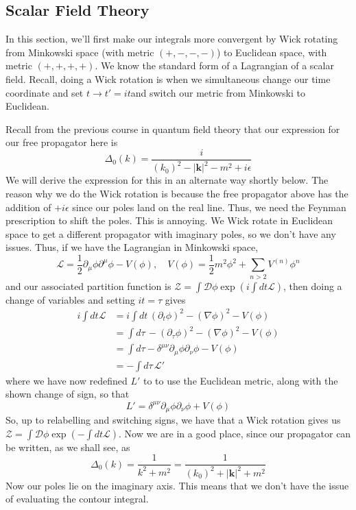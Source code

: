 \documentclass[11pt, oneside]{article}   	%
\theoremstyle{slanted}
\let\vec\mathbf
\begin{document}
\subsection{Scalar Field Theory}
In this section, 
we'll first make our integrals more convergent 
by Wick rotating from Minkowski space (with metric $\left( +, - , -, - \right) $) to Euclidean space, 
with metric $ \left( +, +, + , +  \right) $.
We know the standard form of a Lagrangian 
of a scalar field.
Recall, doing a Wick rotation 
is when we simultaneous change our time coordinate 
and set $ t \to t ' = i t $and switch our metric from Minkowski 
to Euclidean.

Recall from 
the previous course in quantum field theory that our expression for our 
free propagator here 
is
\[
\Delta _ 0 \left( k  \right)   = \frac{i}{\left( k_0  \right)^ 2  - | \vec{k} | ^2  - 	 m ^ 2 + i \epsilon }
\] We will derive 
the expression for this in an alternate way shortly below. 
The reason why we do the Wick rotation is because the 
free propagator above has the addition of $ + i\epsilon $ 
since our poles land on the real line. Thus, 
we need the Feynman prescription to shift the poles. 
This is annoying. We Wick rotate in Euclidean 
space to get a different propagator with imaginary poles, 
so we don't have any issues. 
Thus, if we have the Lagrangian in Minkowski space, 
\[
\mathcal{ L }  = \frac{1}{2 } \partial _ \mu \phi \partial  ^ \mu \phi   - V \left( \phi  \right), 
\quad V \left(\phi  \right)  = \frac{1}{2 } m ^ 2 \phi ^ 2 + 
\sum _{ n > 2} V ^{ \left( n  \right)  } \phi ^ n 
\] and our associated partition function is 
$ \mathcal{ Z }  = \int \mathcal{ D } \phi \exp\left( i \int dt  \mathcal{ L }  \right)    $, 
then doing a change of variables and setting 
$ i t  =  \tau $ gives 
\begin{align*}
i \int dt \mathcal{ L } &=  i \int dt \, 
\left( \partial  _ t \phi  \right)  ^ 2  - \left( \nabla \phi  \right)^ 2 
- V \left( \phi  \right)  	 \\
&=  \int d \tau \,  - \left( 
\partial  _ \tau \phi \right)  ^ 2 
- \left( \nabla \phi  \right)  ^ 2 
- V \left( \phi  \right)  \\ 
&=  \int d \tau 
- \delta ^{ \mu \nu } \partial  _ \mu \phi \partial  _ \nu \phi 
- V \left( \phi  \right)  	 \\
&=   - \int d \tau \, \mathcal{ L ' } 
\end{align*}
where we have now redefined $ L ' $ to 
to use the Euclidean metric, along with the 
shown change of sign, so that 
\[
L '  = \delta ^{ \mu \nu } \partial  _\mu \phi \partial  _ \nu \phi + V \left( \phi  \right) 
\] So, up to relabelling and switching signs, 
we have that a Wick rotation gives us $ \mathcal{ Z }  = 
\int \mathcal{ D } \phi \exp \left(  - \int d t \mathcal{ L }  \right)  $. 
Now we are in a good place, 
since our propagator can be written, as we shall see, 
as \[
\Delta _ 0 \left( k \right) = \frac{1}{k ^ 2 + m ^ 2 }  = 
\frac{1}{\left( k_0  \right)^ 2 + | \vec{k} | ^2 + m ^ 2 }
\] Now our poles lie on the imaginary axis. 
This means that we don't have the issue 
of evaluating the contour integral. 
\end{document}
